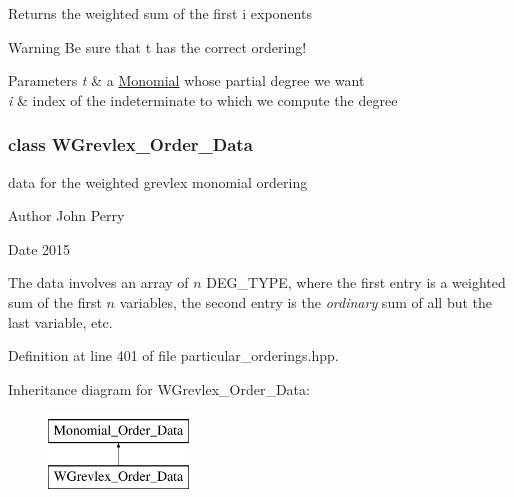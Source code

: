 \begin{DoxyReturn}{Returns}
the weighted sum of the first i exponents 
\end{DoxyReturn}
\begin{DoxyWarning}{Warning}
Be sure that {\ttfamily t} has the correct ordering! 
\end{DoxyWarning}

\begin{DoxyParams}{Parameters}
{\em t} & a \hyperlink{group__polygroup_class_monomial}{Monomial} whose partial degree we want \\
\hline
{\em i} & index of the indeterminate to which we compute the degree \\
\hline
\end{DoxyParams}
\label{class_w_grevlex___order___data}
\subsubsection{class W\+Grevlex\+\_\+\+Order\+\_\+\+Data}
data for the weighted grevlex monomial ordering 

\begin{DoxyAuthor}{Author}
John Perry 
\end{DoxyAuthor}
\begin{DoxyDate}{Date}
2015
\end{DoxyDate}
The data involves an array of $n$ {\ttfamily D\+E\+G\+\_\+\+T\+Y\+PE}, where the first entry is a weighted sum of the first $n$ variables, the second entry is the {\itshape ordinary} sum of all but the last variable, etc. 

Definition at line 401 of file particular\+\_\+orderings.\+hpp.

Inheritance diagram for W\+Grevlex\+\_\+\+Order\+\_\+\+Data\+:\begin{figure}[H]
\begin{center}
\leavevmode
\includegraphics[height=2.000000cm]{group__orderinggroup}
\end{center}
\end{figure}
